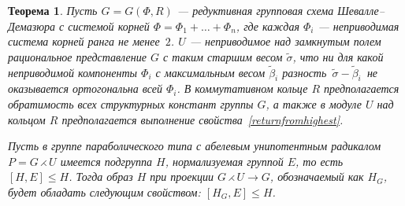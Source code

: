 \documentclass[12pt]{matmex-diploma}
\theoremstyle{mystyleni}
\theoremstyle{mystyle}
\newtheorem{thm}{Теорема}
\newcommand\refb[1]{\ref{#1}}
\renewcommand{\le}{\leqslant}
\begin{document}
\begin{thm}\label{subgroupprojectionmain}
  Пусть $G = G(\Phi, R)$ --- редуктивная групповая схема Шевалле--Демазюра
  с системой корней $\Phi = \Phi_1 + \ldots + \Phi_n$, где каждая $\Phi_i$ --- неприводимая система корней ранга не менее~$2$. $U$ --- неприводимое над замкнутым полем рациональное представление $G$ с таким старшим весом $\widetilde\sigma$, что ни для какой неприводимой компоненты $\Phi_i$ с максимальным весом $\widetilde\beta_i$ разность~${\widetilde\sigma-\widetilde\beta_i}$~не оказывается ортогональна всей $\Phi_i$. В коммутативном кольце $R$ предполагается обратимость всех структурных констант группы $G$, а также в модуле $U$ над кольцом $R$ предполагается выполнение свойства~\refb{returnfromhighest}.
    
  Пусть в группе параболического типа с абелевым унипотентным радикалом $P=G\rightthreetimes U$ имеется подгруппа $H$, нормализуемая группой $E$, то есть $[H,E] \le H$. Тогда образ $H$ при проекции $G \rightthreetimes U \rightarrow G$, обозначаемый как $H_G$, будет обладать следующим свойством: $[H_G,E]\le H$.
\end{thm}
\end{document}
